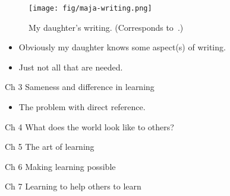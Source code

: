 \begin{frame}
  \begin{figure}
    \texttt{[image: fig/maja-writing.png]}
    \caption{My daughter's writing. (Corresponds to~\cite[Fig.~2.1, 
    p.~30]{NecessaryConditionsOfLearning}.)}
  \end{figure}
  \begin{example}
    \begin{itemize}
      \item Obviously my daughter knows some aspect(s) of writing.
      \item Just not all that are needed.
    \end{itemize}
  \end{example}
\end{frame}

\begin{frame}
  \begin{block}{Ch 3 Sameness and difference in learning}
    \begin{itemize}
      \item The problem with direct reference.
    \end{itemize}
  \end{block}
\end{frame}

\begin{frame}
  \begin{block}{Ch 4 What does the world look like to others?}
  \end{block}
\end{frame}

\begin{frame}
  \begin{block}{Ch 5 The art of learning}
  \end{block}
\end{frame}

\begin{frame}
  \begin{block}{Ch 6 Making learning possible}
  \end{block}
\end{frame}

\begin{frame}
  \begin{block}{Ch 7 Learning to help others to learn}
  \end{block}
\end{frame}
